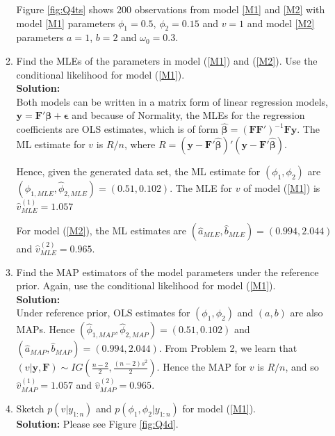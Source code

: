 \documentclass[12pt]{article}\usepackage[]{graphicx}\usepackage[]{color}
\newenvironment{knitrout}{}{} %
\newcommand{\bsep}{\boldsymbol{\epsilon}}
\newcommand{\bsbeta}{\boldsymbol{\beta}}
\newcommand{\bfy}{\mathbf{y}}
\newcommand{\bfF}{\mathbf{F}}
\begin{document}
\begin{enumerate}
\begin{enumerate}
\begin{knitrout}
\end{knitrout}
		Figure \ref{fig:Q4ts} shows 200 observations from model \ref{M1} and \ref{M2} with model \ref{M1} parameters $\phi_1 = 0.5$, $\phi_2 = 0.15$ and $v = 1$ and model \ref{M2} parameters $a = 1$, $b = 2$ and $\omega_0 = 0.3$.
		
		\item Find the MLEs of the parameters in model (\ref{M1}) and (\ref{M2}). Use the conditional likelihood for model (\ref{M1}).\\
		\textbf{Solution:}\\
		Both models can be written in a matrix form of linear regression models, $\bfy = \bfF'\bsbeta + \bsep$ and because of Normality, the MLEs for the regression coefficients are OLS estimates, which is of form $\hat{\bsbeta} = (\bfF\bfF')^{-1}\bfF \bfy$. The ML estimate for $v$ is $R / n$, where $R = (\bfy - \bfF'\hat{\bsbeta})'(\bfy - \bfF'\hat{\bsbeta})$.


		Hence, given the generated data set, the ML estimate for $(\phi_1, \phi_2)$ are $(\hat{\phi}_{1, MLE}, \hat{\phi}_{2, MLE}) = (0.51, 0.102)$. The MLE for $v$ of model (\ref{M1}) is $\hat{v}^{(1)}_{MLE} = 1.057$
		
		For model (\ref{M2}), the ML estimates are $(\hat{a}_{MLE}, \hat{b}_{MLE}) = (0.994, 2.044)$ and $\hat{v}^{(2)}_{MLE} = 0.965$.
		
		\item Find the MAP estimators of the model parameters under the reference prior. Again, use the conditional likelihood for model (\ref{M1}).\\
		\textbf{Solution:}\\


		Under reference prior, OLS estimates for $(\phi_1, \phi_2)$ and $(a, b)$ are also MAPs. Hence $(\hat{\phi}_{1, MAP}, \hat{\phi}_{2, MAP}) = (0.51, 0.102)$ and $(\hat{a}_{MAP}, \hat{b}_{MAP}) = (0.994, 2.044)$. From Problem 2, we learn that $(v|\mathbf{y, F}) \sim IG\left( \frac{n-2}{2}, \frac{(n-2)s^2}{2} \right)$. Hence the MAP for $v$ is $R / n$, and so  $\hat{v}^{(1)}_{MAP} = 1.057$ and  $\hat{v}^{(2)}_{MAP} = 0.965$.
		
		\item Sketch $p(v|y_{1:n})$ and $p(\phi _1, \phi _2 | y_{1:n})$ for model (\ref{M1}).\\
		\textbf{Solution:}
		Please see Figure \ref{fig:Q4d}.
\begin{knitrout}
\color{fgcolor}\begin{figure}[h]


\end{figure}
\end{knitrout}
\end{enumerate}
\end{enumerate}
\end{document}
